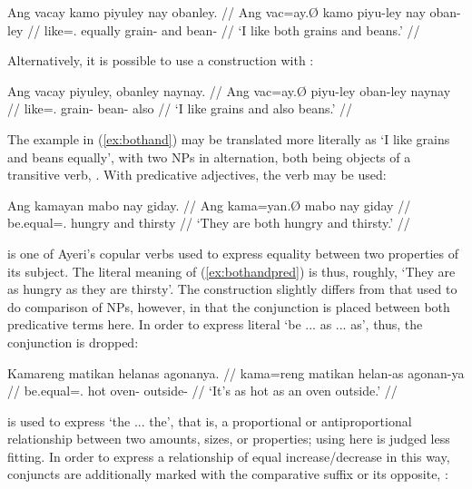 \ex\label{ex:bothand}
\begingl
	\gla Ang vacay kamo piyuley nay obanley. //
	\glb Ang vac=ay.Ø kamo piyu-ley nay oban-ley //
	\glc \AgtT{} like=\Fsg{}.\Top{} equally grain-\PargI{} and
		bean-\PargI{} //
	\glft `I like both grains and beans.' //
\endgl
\xe

Alternatively, it is possible to use a construction with 
:

\ex
\begingl
	\gla Ang vacay piyuley, obanley naynay. //
	\glb Ang vac=ay.Ø piyu-ley oban-ley naynay //
	\glc \AgtT{} like=\Fsg{}.\Top{} grain-\PargI{} bean-\PargI{} also //
	\glft `I like grains and also beans.' //
\endgl
\xe

The example in (\ref{ex:bothand}) may be translated more literally as `I like 
grains and beans equally', with two NPs in alternation, both being objects of a 
transitive verb, . With predicative adjectives, the 
verb  may be used:

\ex\label{ex:bothandpred}
\begingl
	\gla Ang kamayan mabo nay giday. //
	\glb Ang kama=yan.Ø mabo nay giday //
	\glc \AgtT{} be.equal=\TplM{}.\Top{} hungry and thirsty //
	\glft `They are both hungry and thirsty.' //
\endgl
\xe

 is one of Ayeri's copular verbs used to express equality 
between two properties of its subject. The literal meaning of 
(\ref{ex:bothandpred}) is thus, roughly, `They are as hungry as they are 
thirsty'. The construction slightly differs from that used to do comparison of 
NPs, however, in that the conjunction  is placed between both 
predicative terms here. In order to express literal `be ... as ... as', thus, 
the conjunction is dropped:

\ex\label{ex:asas}
\begingl
	\gla Kamareng matikan helanas agonanya. //
	\glb kama=reng matikan helan-as agonan-ya //
	\glc be.equal=\TsgI{}.\Aarg{} hot oven-\Parg{} outside-\Loc{} //
	\glft `It's as hot as an oven outside.' //
\endgl
\xe


 is used to express `the ... the', that is, a 
proportional or antiproportional relationship between two amounts, sizes, 
or properties; using  here is judged less fitting. In 
order to express a relationship of equal increase/decrease in this way, 
conjuncts are additionally marked with the comparative suffix 
 or its opposite, :

